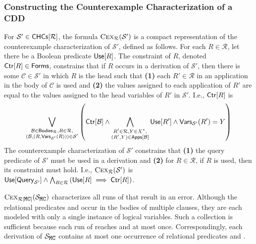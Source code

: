 \subsubsection{Constructing the Counterexample Characterization of a
  CDD}
%
For $\mathcal{S'} \in \mathsf{CHCs}[  \mathcal{R}  ]$, the formula $\textsc{Cex}_{
  \mathcal{R} }(\mathcal{S'})$ is a compact representation of the
counterexample characterization of $\mathcal{S'}$, defined as follows.
For each $R \in \mathcal{R}$, let there be a Boolean predicate
$\mathsf{Use}[ R ]$.
The constraint of $R$, denoted $\mathsf{Ctr}[R] \in \mathsf{Forms}$, constrains
that if $R$ occurs in a derivation of $\mathcal{S'}$, then there is
some $\mathcal{C} \in \mathcal{S'}$ in which $R$ is the head such that
\textbf{(1)} each $R' \in \mathcal{R}$ in an application in the body
of $\mathcal{C}$ is used and \textbf{(2)} the values assigned to each
application of $R'$ are equal to the values assigned to the head
variables of $R'$ in $\mathcal{S'}$.
%
I.e., $\mathsf{Ctr}[R]$ is
\begin{align*}
\biglor_{ \substack{ \mathcal{B} \in \bodies{ \mathcal{R} }, %
    R \in \mathcal{R}, \\
  (\mathcal{B}, (R, \varsof{ \mathcal{S'} }(R))) \in
  \mathcal{S'} } } %
\left( \ctrof{ \mathcal{B} } \land %
\bigland_{ \substack{R' \in \mathcal{R}, Y \in X^{*}, \\
    (R', Y) \in \appsof{ \mathcal{B} } } } %
\used{R'} \land \varsof{ \mathcal{S'} }(R') = Y \right)
\end{align*}
%
The counterexample characterization of $\mathcal{S'}$ constrains that
\textbf{(1)} the query predicate of $\mathcal{S'}$ must be used in a
derivation and %
\textbf{(2)} for $R \in \mathcal{R}$, if $R$ is used, then its
constraint must hold.
%
I.e., $\textsc{Cex}_{ \mathcal{R} }(\mathcal{S'})$ is $\used{
  \queryof{\mathcal{S'} } } \land %
\bigland_{R \in \mathcal{R} } \left( \used{R} \implies \ctrof{R}
\right)$.

\begin{ex}
  $\vc{ \mcpreds }(\mcchc)$ characterizes all runs of 
  that result in an error.
  Although the relational predicates  and  occur in the
  bodies of multiple clauses, they are each modeled with only a single
  instance of logical variables.
  Such a collection is sufficient because each run of 
  reaches  and  at most once.
  Correspondingly, each derivation of $\mcchc$ contains at most one
  occurrence of relational predicates  and .
\end{ex}

